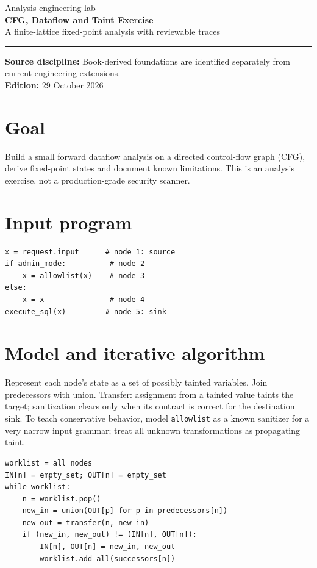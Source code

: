 \documentclass[10pt,letterpaper]{article}
\begin{document}
\hypersetup{pageanchor=false}%
\begin{titlepage}
\vspace*{1.0in}
{\color{bluegray}\Large Analysis engineering lab}\\[1.0em]
{\color{navy}\Huge\bfseries CFG, Dataflow and Taint Exercise}\\[0.7em]
{\Large A finite-lattice fixed-point analysis with reviewable traces}\\[2.0em]
\rule{\linewidth}{1.0pt}
\vfill
\textbf{Source discipline:} Book-derived foundations are identified separately from current engineering extensions.\\
\textbf{Edition:} 29 October 2026
\end{titlepage}\hypersetup{pageanchor=true}
\tableofcontents
\clearpage
\section{Goal}
Build a small forward dataflow analysis on a directed control-flow graph (CFG), derive fixed-point states and document known limitations. This is an analysis exercise, not a production-grade security scanner.
\section{Input program}
\begin{lstlisting}
x = request.input      # node 1: source
if admin_mode:          # node 2
    x = allowlist(x)    # node 3
else:
    x = x               # node 4
execute_sql(x)         # node 5: sink
\end{lstlisting}
\section{Model and iterative algorithm}
Represent each node's state as a set of possibly tainted variables. Join predecessors with union. Transfer: assignment from a tainted value taints the target; sanitization clears only when its contract is correct for the destination sink. To teach conservative behavior, model \texttt{allowlist} as a known sanitizer for a very narrow input grammar; treat all unknown transformations as propagating taint.
\begin{lstlisting}
worklist = all_nodes
IN[n] = empty_set; OUT[n] = empty_set
while worklist:
    n = worklist.pop()
    new_in = union(OUT[p] for p in predecessors[n])
    new_out = transfer(n, new_in)
    if (new_in, new_out) != (IN[n], OUT[n]):
        IN[n], OUT[n] = new_in, new_out
        worklist.add_all(successors[n])
\end{lstlisting}
\end{document}
